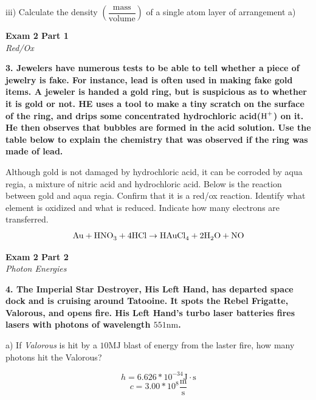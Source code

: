 \documentclass{article}
\begin{document}
    iii) Calculate the density $(\dfrac{\text{mass}}{\text{volume}})$ of a single atom layer of arrangement a)

    \pagebreak

    \begin{center}
        \textbf{Exam 2 Part 1}\\
        \textit{Red/Ox}
    \end{center}
    \textbf{3. Jewelers have numerous tests to be able to tell whether a piece of jewelry is fake. For instance, lead is often used in making fake gold items. A jeweler is handed a gold ring, but is suspicious as to whether it is gold or not. HE uses a tool to make a tiny scratch on the surface of the ring, and drips some concentrated hydrochloric acid($\ce{H^{+}}$) on it. He then observes that bubbles are formed in the acid solution. Use the table below to explain the chemistry that was observed if the ring was made of lead.}

    Although gold is not damaged by hydrochloric acid, it can be corroded by aqua regia, a mixture of nitric acid and hydrochloric acid. Below is the reaction between gold and aqua regia. Confirm that it is a red/ox reaction. Identify what element is oxidized and what is reduced. Indicate how many electrons are transferred.
    $$\ce{Au} + \ce{HNO_{3}} + \ce{4 HCl} \rightarrow \ce{HAuCl_{4}} + \ce{2 H_{2}O} + \ce{NO}$$

    \pagebreak

    \begin{center}
        \textbf{Exam 2 Part 2}\\
        \textit{Photon Energies}
    \end{center}
    \textbf{4. The Imperial Star Destroyer, His Left Hand, has departed space dock and is cruising around Tatooine. It spots the Rebel Frigatte, Valorous, and opens fire. His Left Hand's turbo laser batteries fires lasers with photons of wavelength $551 \si{\nano\meter}$.}

    a) If \textit{Valorous} is hit by a $10 \si{\mega\joule}$ blast of energy from the laster fire, how many photons hit the Valorous?

    $$ h = 6.626 * 10^{-34} \si{\joule} \cdot \si{\second}$$
    $$ c = 3.00 * 10^{8} \frac{\si{\meter}}{\si{\second}} $$
\end{document}
